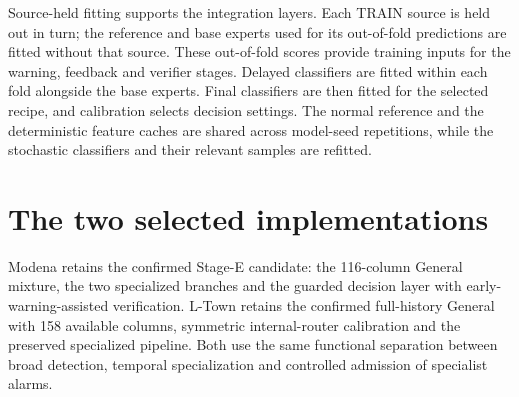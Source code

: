 Source-held fitting supports the integration layers. Each TRAIN source is held out in turn; the reference and base experts used for its out-of-fold predictions are fitted without that source. These out-of-fold scores provide training inputs for the warning, feedback and verifier stages. Delayed classifiers are fitted within each fold alongside the base experts. Final classifiers are then fitted for the selected recipe, and calibration selects decision settings. The normal reference and the deterministic feature caches are shared across model-seed repetitions, while the stochastic classifiers and their relevant samples are refitted.

\section{The two selected implementations}
Modena retains the confirmed Stage-E candidate: the 116-column General mixture, the two specialized branches and the guarded decision layer with early-warning-assisted verification. L-Town retains the confirmed full-history General with 158 available columns, symmetric internal-router calibration and the preserved specialized pipeline. Both use the same functional separation between broad detection, temporal specialization and controlled admission of specialist alarms.

